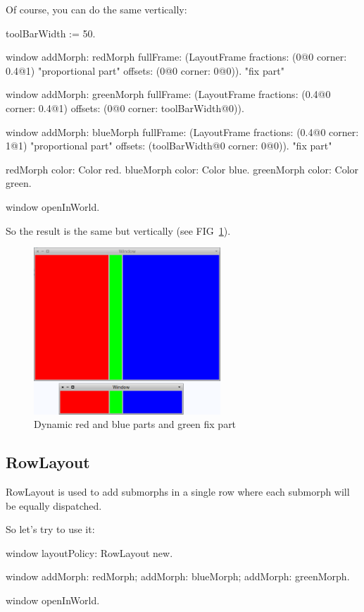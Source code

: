 \documentclass[a4paper,10pt,twoside]{book}
\begin{document}
Of course, you can do the same vertically:
\begin{code}{}
toolBarWidth := 50.

window
	addMorph: redMorph
	fullFrame: (LayoutFrame
				fractions: (0@0 corner: 0.4@1) "proportional part"
				offsets: (0@0 corner: 0@0)). "fix part"
				
window
	addMorph: greenMorph
	fullFrame: (LayoutFrame
				fractions: (0.4@0 corner: 0.4@1)
				offsets: (0@0 corner: toolBarWidth@0)).				

window
	addMorph: blueMorph
	fullFrame: (LayoutFrame
				fractions: (0.4@0 corner: 1@1) "proportional part"
				offsets: (toolBarWidth@0 corner: 0@0)). "fix part"

redMorph color: Color red.
blueMorph color: Color blue.
greenMorph color: Color green.
	
window openInWorld.
\end{code}

So the result is the same but vertically (see FIG~\ref{fig:layoutFrame4}).

\begin{figure}[ht]\centering
	\includegraphics[width=7cm]{LayoutFrame4}
	\caption{Dynamic red and blue parts and green fix part}
	\label{fig:layoutFrame4}
\end{figure}

\subsection{RowLayout}

RowLayout is used to add submorphs in a single row where each submorph will be equally dispatched.

So let's try to use it: 
\begin{code}{}
window layoutPolicy: RowLayout new.

window 
	addMorph: redMorph;
	addMorph: blueMorph;
	addMorph: greenMorph.

window openInWorld.
\end{code}
\end{document}
